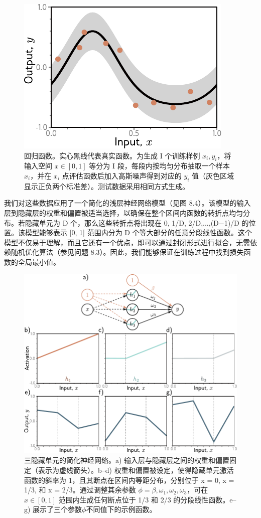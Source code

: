 \documentclass[lang=cn,newtx,10pt,scheme=chinese]{elegantbook}
\begin{document}
\begin{figure}[ht!]
\centering
\includegraphics[width=0.7\linewidth]{PDFFigures/UDLChap8PDF/PerfDataSet.pdf}
\caption{回归函数。实心黑线代表真实函数。为生成 I 个训练样例 \({x_i,y_i}\)，将输入空间 \(x \in [0,1]\) 等分为 I 段，每段内按均匀分布抽取一个样本 \(x_i\)，并在 \(x_i\) 点评估函数后加入高斯噪声得到对应的 \(y_i\) 值（灰色区域显示正负两个标准差）。测试数据采用相同方式生成。}
\end{figure}


我们对这些数据应用了一个简化的浅层神经网络模型（见图 8.4）。该模型的输入层到隐藏层的权重和偏置被适当选择，以确保在整个区间内函数的转折点均匀分布。若隐藏单元为 D 个，那么这些转折点将出现在 0, 1/D, 2/D,...,(D−1)/D 的位置。该模型能够表示 [0, 1] 范围内分为 D 个等大部分的任意分段线性函数。这个模型不仅易于理解，而且它还有一个优点，即可以通过封闭形式进行拟合，无需依赖随机优化算法（参见问题 8.3）。因此，我们能够保证在训练过程中找到损失函数的全局最小值。

\begin{figure}[ht!]
\centering
\includegraphics[width=0.7\linewidth]{PDFFigures/UDLChap8PDF/PerfModel.pdf}
\caption{三隐藏单元的简化神经网络。a) 输入层与隐藏层之间的权重和偏置固定（表示为虚线箭头）。b–d) 权重和偏置被设定，使得隐藏单元激活函数的斜率为 1，且其断点在区间内等距分布，分别位于 x = 0, x = 1/3, 和 x = 2/3。通过调整其余参数 \(\phi = {\beta, \omega_1, \omega_2, \omega_3}\)，可在 \(x \in [0,1]\) 范围内生成任何断点位于 1/3 和 2/3 的分段线性函数。e–g) 展示了三个参数\(\phi\)不同值下的示例函数。}
\end{figure}
\end{document}
